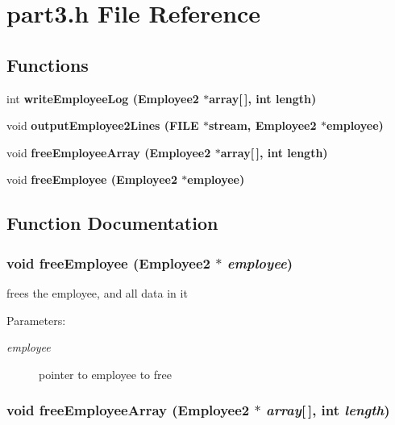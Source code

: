 \section{part3.h File Reference}
\label{part3_8h}
\subsection*{Functions}
\begin{CompactItemize}
\item 
int \bf{write\-Employee\-Log} (\bf{Employee2} $\ast$array[$\,$], int length)
\item 
void \bf{output\-Employee2Lines} (FILE $\ast$stream, \bf{Employee2} $\ast$employee)
\item 
void \bf{free\-Employee\-Array} (\bf{Employee2} $\ast$array[$\,$], int length)
\item 
void \bf{free\-Employee} (\bf{Employee2} $\ast$employee)
\end{CompactItemize}


\subsection{Function Documentation}
\subsubsection{\setlength{\rightskip}{0pt plus 5cm}void free\-Employee (\bf{Employee2} $\ast$ {\em employee})}\label{part3_8h_281efe844097b8093f78ae38a89eb9cc}


frees the employee, and all data in it \begin{Desc}
\item[Parameters:]
\begin{description}
\item[{\em employee}]pointer to employee to free \end{description}
\end{Desc}
\subsubsection{\setlength{\rightskip}{0pt plus 5cm}void free\-Employee\-Array (\bf{Employee2} $\ast$ {\em array}[$\,$], int {\em length})}\label{part3_8h_d8ca09b05dde37253b6d3b2f70e740fb}


